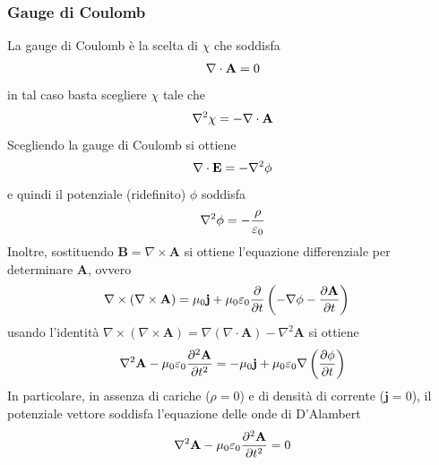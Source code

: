 \documentclass{article}
\begin{document}
\subsubsection*{Gauge di Coulomb}
La gauge di Coulomb è la scelta di $\chi$ che soddisfa 
\begin{align}
    \nabla \cdot \mathbf{A} = 0 \notag
\end{align}
in tal caso basta scegliere $\chi$ tale che 
\begin{align}
    \nabla^2\chi = - \nabla \cdot \mathbf{A} \notag
\end{align}
Scegliendo la gauge di Coulomb si ottiene 
\begin{align}
    \nabla \cdot \mathbf{E} = - \nabla^2\phi \notag
\end{align}
e quindi il potenziale (ridefinito) $\phi$ soddisfa 
\begin{align}
    \nabla^2\phi = -\frac{\rho}{\varepsilon_0} \notag
\end{align}
Inoltre, sostituendo $\mathbf{B} = \nabla \times \mathbf{A}$ si ottiene l'equazione differenziale per determinare $\mathbf{A}$, ovvero 
\begin{align}
    \nabla \times (\nabla \times \mathbf{A}) &= \mu_0\mathbf{j} + \mu_0\varepsilon_0\frac{\partial}{\partial t}\left(-\nabla\phi - \frac{\partial \mathbf{A}}{\partial t}\right) \notag
\end{align}
usando l'identità $\nabla \times (\nabla \times \mathbf{A}) = \nabla(\nabla \cdot \mathbf{A}) - \nabla^2\mathbf{A}$ si ottiene
\begin{align}
    \nabla^2\mathbf{A} - \mu_0\varepsilon_0\frac{\partial^2\mathbf{A}}{\partial t^2} = -\mu_0\mathbf{j} + \mu_0\varepsilon_0\nabla\left(\frac{\partial\phi}{\partial t}\right) \notag
\end{align}
In particolare, in assenza di cariche ($\rho = 0$) e di densità di corrente ($\mathbf{j} = 0$), il potenziale vettore soddisfa l'equazione delle onde di D'Alambert 
\begin{align}
    \nabla^2\mathbf{A} - \mu_0\varepsilon_0\frac{\partial^2\mathbf{A}}{\partial t^2} = 0 \notag
\end{align}
\end{document}
